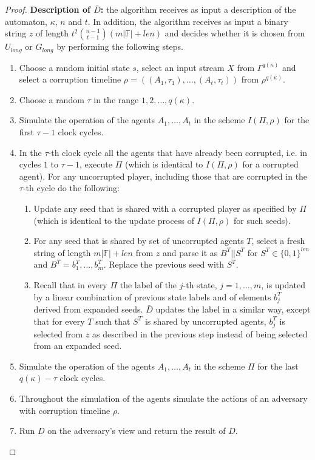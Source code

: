 \documentclass[letterpaper,11pt]{article}
\newcommand{\abs}[1]{\left| #1\right|}
\begin{document}
\begin{proof}
\medskip
\noindent
{\bf Description of $\bar{D}$:} the algorithm receives as input a description of the automaton, $\kappa$, $n$ and $t$. In addition, the algorithm receives as input a binary string $z$ of length $t^2 {n-1 \choose t-1} (m\abs{\mathbb{F}}+len)$ and decides whether it is chosen from $U_{long}$ or $G_{long}$ by performing the following steps.
\begin{enumerate}
\item Choose a random initial state $s$, select an input stream $X$ from $\Gamma^{q(\kappa)}$ and select a corruption timeline $\rho=((A_1,\tau_1),\ldots,(A_t,\tau_t))$ from $\rho^{q(\kappa)}$.
\item Choose a random $\tau$ in the range $1,2,\ldots,q(\kappa)$.
\item Simulate the operation of the agents $A_1,\ldots,A_t$ in the scheme $I(\Pi, \rho)$ for the first $\tau-1$ clock cycles.
\item In the $\tau$-th clock cycle all the agents that have already been corrupted, i.e. in cycles $1$ to $\tau-1$, execute $\Pi$ (which is identical to $I(\Pi, \rho)$ for a corrupted agent). For any uncorrupted player, including those that are corrupted in the $\tau$-th cycle do the following:
\begin{enumerate}
\item Update any seed that is shared with a corrupted player as specified by $\Pi$ (which is identical to the update process of $I(\Pi, \rho)$ for such seeds).
\item For any seed that is shared by set of uncorrupted agents $T$, select a fresh string of length $m\abs{\mathbb{F}}+len$ from $z$ and parse it as $B^T||S^T$ for $S^T \in \{0,1\}^{len}$ and $B^T=b_1^T,\ldots,b_m^T$. Replace the previous seed with $S^T$. 
\item Recall that in every $\Pi$ the label of the $j$-th state, $j=1,\ldots,m$, is updated by a linear combination of previous state labels and of elements $b_j^T$ derived from expanded seeds. $\bar{D}$ updates the label in a similar way, except that for every $T$ such that $S^T$ is shared by uncorrupted agents, $b_j^T$ is selected from $z$ as described in the previous step instead of being selected from an expanded seed.  
\end{enumerate}
\item Simulate the operation of the agents $A_1,\ldots,A_t$ in the scheme $\Pi$ for the last $q(\kappa)-\tau$ clock cycles.
\item Throughout the simulation of the agents simulate the actions of an adversary with corruption timeline $\rho$.
\item Run $D$ on the adversary's view and return the result of $D$.
\end{enumerate}


\end{proof}
\end{document}
